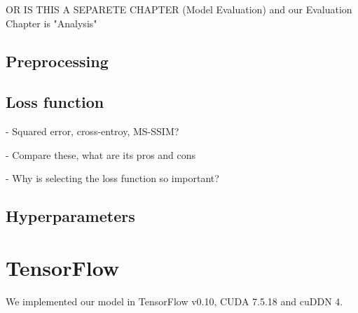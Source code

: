 OR IS THIS A SEPARETE CHAPTER (Model Evaluation) and our Evaluation Chapter is "Analysis"

\subsection{Preprocessing}

\subsection{Loss function}

- Squared error, cross-entroy, MS-SSIM?

- Compare these, what are its pros and cons

- Why is  selecting the loss function so important?

\subsection{Hyperparameters}

\section{TensorFlow}

We implemented our model in TensorFlow v0.10, CUDA 7.5.18 and cuDDN 4.




